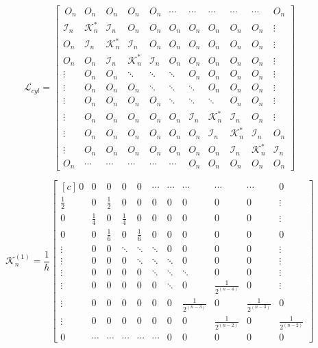 \[ 
\mathcal{L}_{cyl} = 
\begin{bmatrix} \,
O_{n} & O_{n} & O_{n} & O_{n} & O_{n} & \cdots & \cdots & \cdots & \cdots & \cdots & O_{n}\\
\mathcal{I}_{n} & \mathcal{K}_{n}^{*} & \mathcal{I}_{n} & O_{n} & O_{n} & O_{n} & O_{n} & O_{n} & O_{n} & O_{n} & \vdots\\
O_{n} & \mathcal{I}_{n} & \mathcal{K}_{n}^{*} & \mathcal{I}_{n} & O_{n} & O_{n} & O_{n} & O_{n} & O_{n} & O_{n} & \vdots\\
O_{n} & O_{n}  & \mathcal{I}_{n} & \mathcal{K}_{n}^{*} & \mathcal{I}_{n} & O_{n} & O_{n} & O_{n} & O_{n} & O_{n} & \vdots\\
\vdots & O_{n}  & O_{n}  & \ddots & \ddots & \ddots & O_{n} & O_{n} & O_{n} & O_{n}  & \vdots \\
\vdots & O_{n}  & O_{n}  & O_{n}  & \ddots & \ddots & \ddots & O_{n} & O_{n} & O_{n} & \vdots \\
\vdots & O_{n}  & O_{n}  & O_{n} & O_{n} & \ddots & \ddots & \ddots & O_{n} & O_{n}  & \vdots \\
\vdots & O_{n}  & O_{n}  & O_{n} & O_{n} & O_{n} & \mathcal{I}_{n} & \mathcal{K}_{n}^{*} & \mathcal{I}_{n} & O_{n}  & \vdots\\
\vdots & O_{n}  & O_{n}  & O_{n} & O_{n} & O_{n} & O_{n} & \mathcal{I}_{n} & \mathcal{K}_{n}^{*}  & \mathcal{I}_{n} & O_{n}\\
\vdots & O_{n} & O_{n} & O_{n} & O_{n} & O_{n} & O_{n} & O_{n} & \mathcal{I}_{n} & \mathcal{K}_{n}^{*} & \mathcal{I}_{n}\\
O_{n}      & \cdots & \cdots & \cdots & \cdots & \cdots & O_{n} & O_{n} & O_{n} & O_{n} & {O}_{n}
\end{bmatrix} 
\]

\[
    \mathcal{K}_n^{(1)} = 
\frac{1}{h}
\begin{bmatrix*}[c] \,
0 & 0 & 0 & 0& 0 & \cdots & \cdots & \cdots & \cdots & \cdots & 0 \\
\frac{1}{2} & 0 & \frac{1}{2} & 0 & 0 & 0 & 0 & 0 & 0 & 0 & \vdots \\
0 & \frac{1}{4} & 0 & \frac{1}{4} & 0 & 0 & 0 & 0 & 0 & 0 & \vdots \\
0 & 0 & \frac{1}{6} & 0 & \frac{1}{6} & 0 & 0 & 0 & 0 & 0 & 0 \\
\vdots & 0  & 0  & \ddots & \ddots & \ddots & 0 & 0 & 0 & 0  & \vdots \\
\vdots & 0  & 0  & 0  & \ddots & \ddots & \ddots & 0 & 0 & 0 & \vdots \\
\vdots & 0  & 0  & 0 & 0 & \ddots & \ddots & \ddots & 0 & 0  & \vdots \\
\vdots & 0  & 0  & 0 & 0 & 0 & \ddots & 0 & \frac{1}{2^{(n-4)}} & 0  & \vdots\\
\vdots & 0  & 0  & 0 & 0 & 0 & 0 & \frac{1}{2^{(n-3)}} & 0  & \frac{1}{2^{(n-3)}} & 0\\
\vdots & 0 & 0 & 0 & 0 & 0 & 0 & 0 & \frac{1}{2^{(n-2)}} & 0 & \frac{1}{2^{(n-2)}}\\
0      & \cdots & \cdots & \cdots & \cdots & \cdots & 0 & 0 & 0 & 0 & 0 
\end{bmatrix*}
\]

